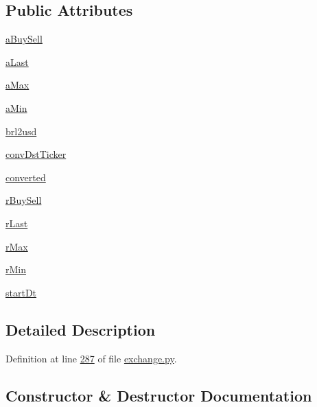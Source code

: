 \subsection*{Public Attributes}
\begin{DoxyCompactItemize}
\item 
\hyperlink{classexchange_1_1_diff_tracker_ae6108d1ec0cdf3b195ed5bb7c8b529b2}{a\+Buy\+Sell}
\item 
\hyperlink{classexchange_1_1_diff_tracker_ae428ab91ae6471c4ad8b566540fb035e}{a\+Last}
\item 
\hyperlink{classexchange_1_1_diff_tracker_a3dcbc689ebb5ec6e0c8e600079d95de9}{a\+Max}
\item 
\hyperlink{classexchange_1_1_diff_tracker_a65d042348359fa27a17e092e66405ae7}{a\+Min}
\item 
\hyperlink{classexchange_1_1_diff_tracker_a6adc6f18dd9b5d2d8ea8978235cb569d}{brl2usd}
\item 
\hyperlink{classexchange_1_1_diff_tracker_a8eb45d1c936bc32a5732d59a387265dc}{conv\+Dst\+Ticker}
\item 
\hyperlink{classexchange_1_1_diff_tracker_a3dac3e23c410307f41327725701fbd10}{converted}
\item 
\hyperlink{classexchange_1_1_diff_tracker_aab406fe7b4dc6d486c4a9fb65944a4df}{r\+Buy\+Sell}
\item 
\hyperlink{classexchange_1_1_diff_tracker_a4dbaf0a1192448101cb35eca617c7f0f}{r\+Last}
\item 
\hyperlink{classexchange_1_1_diff_tracker_ab4266c6d4fc968997e26044a7c827980}{r\+Max}
\item 
\hyperlink{classexchange_1_1_diff_tracker_ad3250cb94933244444942dec9199d362}{r\+Min}
\item 
\hyperlink{classexchange_1_1_diff_tracker_aa9d0293d5485e1f711db62e59ab11a8a}{start\+Dt}
\end{DoxyCompactItemize}


\subsection{Detailed Description}


Definition at line \hyperlink{exchange_8py_source_l00287}{287} of file \hyperlink{exchange_8py_source}{exchange.\+py}.



\subsection{Constructor \& Destructor Documentation}
\mbox{\label{classexchange_1_1_diff_tracker_ab9d1d8ef6d877d209ace871e195b284c}} 
